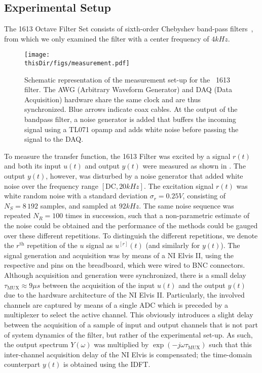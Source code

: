 \subsection{Experimental Setup}
The \BK{} 1613 Octave Filter Set consists of sixth-order Chebyshev band-pass filters~\citep{datasheet_bk1613}, from which we only examined the filter with a center frequency of $4\unit{kHz}$.

\begin{figure}
  \centering
  \texttt{[image: \\thisDir/figs/measurement.pdf]}
  \caption[Measurement schematic of \BK\ 1613 filter.]{Schematic representation of the measurement set-up for the \BK\ 1613 filter. The AWG (Arbitrary Waveform Generator) and DAQ (Data Acquisition) hardware share the same clock and are thus synchronized. 
  Blue arrows indicate coax cables. 
  At the output of the bandpass filter, a noise generator is added that buffers the incoming signal using a TL071 opamp and adds white noise before passing the signal to the DAQ.} 
  \label{fig:measurementSetup}
\end{figure}


To measure the transfer function, the \BK{} 1613 Filter was excited by a signal $r(t)$ and both its input $u(t)$ and output $y(t)$ were measured as shown in .
The output $y(t)$, however, was disturbed by a noise generator that added white noise over the frequency range $[\mathrm{DC}, 20\unit{kHz}]$.
The excitation signal $r(t)$ was white random noise with a standard deviation $\sigma_r = 0.25 \unit{V}$, consisting of $N_S = 8\,192$ samples, and sampled at $92 \unit{kHz}$.
The same noise sequence was repeated $N_R = 100$ times in succession, such that a non-parametric estimate of the noise could be obtained and the performance of the methods could be gauged over these different repetitions.
To distinguish the different repetitions, we denote the $r^{\text{th}}$ repetition of the $u$ signal as $u^{[r]}(t)$ (and similarly for $y(t)$).
The signal generation and acquisition was by means of a \gls{NI} Elvis II, using the respective  and  pins on the breadboard, which were wired to BNC connectors.
Although acquisition and generation were synchronized, there is a small delay $\tau_{\mathrm{MUX}} \approx 9\unit{\mu s}$ between the acquisition of the input $u(t)$ and the output $y(t)$ due to the hardware architecture of the \gls{NI} Elvis II.
Particularly, the involved channels are captured by means of a single \gls{ADC} which is preceded by a multiplexer to select the active channel.
This obviously introduces a slight delay between the acquisition of a sample of input and output channels that is not part of system dynamics of the \BK{} filter, but rather of the experimental set-up.
As such, the output spectrum $Y(\omega)$ was multiplied by $\exp\left(-j\omega\tau_{\mathrm{MUX}} \right)$ such that this inter-channel acquisition delay of the \gls{NI} Elvis is compensated; the time-domain counterpart $y(t)$ is obtained using the \gls{IDFT}.

